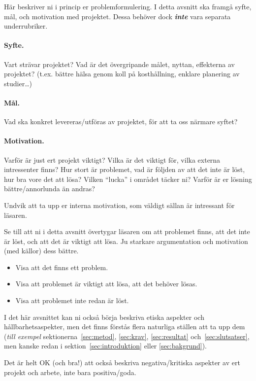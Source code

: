Här beskriver ni i princip er problemformulering.  I detta avsnitt ska framgå syfte, mål, och motivation med projektet. 
Dessa behöver dock \emph{\textbf{inte}} vara separata underrubriker.

\paragraph{Syfte.} Vart strävar projektet? Vad är det övergripande målet, nyttan, effekterna av projektet?  (t.ex. bättre hälsa genom koll på kosthållning, enklare planering av studier\ldots)
\paragraph{Mål.} Vad ska konkret levereras/utföras av projektet, för att ta oss närmare syftet?
\paragraph{Motivation.}  Varför är just ert projekt viktigt?  Vilka är det viktigt för, vilka externa intressenter finns?  Hur stort är problemet, vad är följden av att det inte är löst, hur bra vore det att lösa?  Vilken ``lucka'' i området täcker ni?
Varför är er lösning bättre/annorlunda än andras?

Undvik att ta upp er interna motivation, som väldigt sällan är intressant för läsaren.

Se till att ni i detta avsnitt övertygar läsaren om att problemet finns, att det inte är löst, och att det är viktigt att lösa. Ju starkare argumentation och motivation (med källor) dess bättre.
\begin{itemize}
\item Visa att det finns ett problem.
\item Visa att problemet är viktigt att lösa, att det behöver lösas.
\item Visa att problemet inte redan är löst.
\end{itemize}

I det här avsnittet kan ni också börja beskriva etiska aspekter och hållbarhetsaspekter, men det finns förstås flera naturliga ställen att ta upp dem (\emph{till exempel} sektionerna~\ref{sec:metod}, \ref{sec:krav}, \ref{sec:resultat} och~\ref{sec:slutsatser}, men kanske redan i sektion~\ref{sec:introduktion} eller \ref{sec:bakgrund}).

Det är helt OK (och bra!) att också beskriva negativa/kritiska aspekter av ert projekt och arbete, inte bara positiva/goda. 

